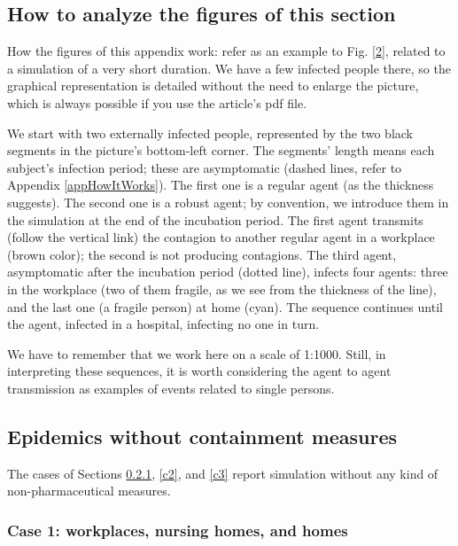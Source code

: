 \documentclass[graybox]{svmult}
\begin{document}
\subsection{How to analyze the figures of this section}
\label{howToAnalyze}

How the figures of this appendix work: refer as an example to Fig. \ref{2}, related to a simulation of a very short duration. We have a few infected people there, so the graphical representation is detailed without the need to enlarge the picture, which is always possible if you use the article's pdf file.

We start with two externally infected people, represented by the two black segments in the picture's bottom-left corner. The segments' length means each subject's infection period; these are asymptomatic (dashed lines, refer to Appendix \ref{appHowItWorks}). The first one is a regular agent (as the thickness suggests). The second one is a robust agent; by convention, we introduce them in the simulation at the end of the incubation period. The first agent transmits (follow the vertical link) the contagion to another regular agent in a workplace (brown color); the second is not producing contagions. The third agent, asymptomatic after the incubation period (dotted line), infects four agents: three in the workplace (two of them fragile, as we see from the thickness of the line), and the last one (a fragile person) at home (cyan). The sequence continues until the  agent, infected in a hospital, infecting no one in turn.

We have to remember that we work here on a scale of 1:1000. Still, in interpreting these sequences, it is worth considering the agent to agent transmission as examples of events related to single persons.


\subsection{Epidemics without containment measures}

The cases of Sections \ref{c1}, \ref{c2}, and \ref {c3} report simulation without any kind of non-pharmaceutical measures.


\subsubsection{Case 1: workplaces, nursing homes, and homes}
\label{c1}
\end{document}
